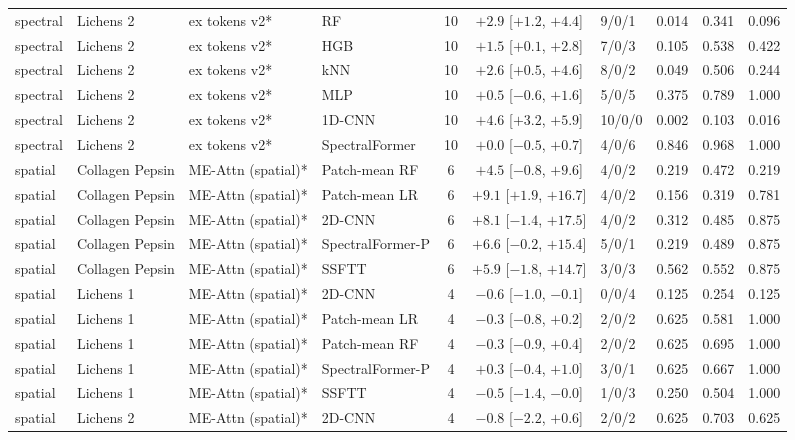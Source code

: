 \begin{tabular}{llllcclccc}
spectral & Lichens 2 & ex tokens v2* & RF & 10 & $+2.9$ [$+1.2$, $+4.4$] & 9/0/1 & 0.014 & 0.341 & 0.096 \\
spectral & Lichens 2 & ex tokens v2* & HGB & 10 & $+1.5$ [$+0.1$, $+2.8$] & 7/0/3 & 0.105 & 0.538 & 0.422 \\
spectral & Lichens 2 & ex tokens v2* & kNN & 10 & $+2.6$ [$+0.5$, $+4.6$] & 8/0/2 & 0.049 & 0.506 & 0.244 \\
spectral & Lichens 2 & ex tokens v2* & MLP & 10 & $+0.5$ [$-0.6$, $+1.6$] & 5/0/5 & 0.375 & 0.789 & 1.000 \\
spectral & Lichens 2 & ex tokens v2* & 1D-CNN & 10 & $+4.6$ [$+3.2$, $+5.9$] & 10/0/0 & 0.002 & 0.103 & 0.016 \\
spectral & Lichens 2 & ex tokens v2* & SpectralFormer & 10 & $+0.0$ [$-0.5$, $+0.7$] & 4/0/6 & 0.846 & 0.968 & 1.000 \\
\midrule
spatial & Collagen Pepsin & ME-Attn (spatial)* & Patch-mean RF & 6 & $+4.5$ [$-0.8$, $+9.6$] & 4/0/2 & 0.219 & 0.472 & 0.219 \\
spatial & Collagen Pepsin & ME-Attn (spatial)* & Patch-mean LR & 6 & $+9.1$ [$+1.9$, $+16.7$] & 4/0/2 & 0.156 & 0.319 & 0.781 \\
spatial & Collagen Pepsin & ME-Attn (spatial)* & 2D-CNN & 6 & $+8.1$ [$-1.4$, $+17.5$] & 4/0/2 & 0.312 & 0.485 & 0.875 \\
spatial & Collagen Pepsin & ME-Attn (spatial)* & SpectralFormer-P & 6 & $+6.6$ [$-0.2$, $+15.4$] & 5/0/1 & 0.219 & 0.489 & 0.875 \\
spatial & Collagen Pepsin & ME-Attn (spatial)* & SSFTT & 6 & $+5.9$ [$-1.8$, $+14.7$] & 3/0/3 & 0.562 & 0.552 & 0.875 \\
\midrule
spatial & Lichens 1 & ME-Attn (spatial)* & 2D-CNN & 4 & $-0.6$ [$-1.0$, $-0.1$] & 0/0/4 & 0.125 & 0.254 & 0.125 \\
spatial & Lichens 1 & ME-Attn (spatial)* & Patch-mean LR & 4 & $-0.3$ [$-0.8$, $+0.2$] & 2/0/2 & 0.625 & 0.581 & 1.000 \\
spatial & Lichens 1 & ME-Attn (spatial)* & Patch-mean RF & 4 & $-0.3$ [$-0.9$, $+0.4$] & 2/0/2 & 0.625 & 0.695 & 1.000 \\
spatial & Lichens 1 & ME-Attn (spatial)* & SpectralFormer-P & 4 & $+0.3$ [$-0.4$, $+1.0$] & 3/0/1 & 0.625 & 0.667 & 1.000 \\
spatial & Lichens 1 & ME-Attn (spatial)* & SSFTT & 4 & $-0.5$ [$-1.4$, $-0.0$] & 1/0/3 & 0.250 & 0.504 & 1.000 \\
\midrule
spatial & Lichens 2 & ME-Attn (spatial)* & 2D-CNN & 4 & $-0.8$ [$-2.2$, $+0.6$] & 2/0/2 & 0.625 & 0.703 & 0.625 \\

\end{tabular}
